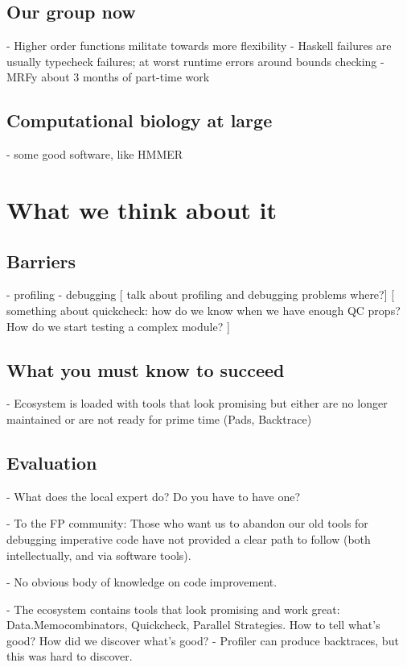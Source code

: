 \documentclass[preprint]{sigplanconf}
\begin{document}
\subsection{Our group now}
 - Higher order functions militate towards more flexibility
 - Haskell failures are usually typecheck failures; at worst runtime errors around bounds checking
 - MRFy about 3 months of part-time work

\subsection{Computational biology at large}
 - some good software, like HMMER

\section{What we think about it}

\subsection{Barriers}

- profiling
- debugging
 [ talk about profiling and debugging problems where?]
[ something about quickcheck: how do we know when we have enough QC props? How do we start testing a complex module? ]

\subsection{What you must know to succeed}
- Ecosystem is loaded with tools that look promising but either are no longer maintained or are not ready for prime time (Pads, Backtrace)

\subsection{Evaluation}
- What does the local expert do? Do you have to have one?

- To the FP community: Those who want us to abandon our old tools for debugging imperative code have not provided a clear path to follow (both intellectually, and via software tools).

- No obvious body of knowledge on code improvement.

- The ecosystem contains tools that look promising and work great: Data.Memocombinators, Quickcheck, Parallel Strategies. How to tell what's good? How did we discover what's good?
- Profiler can produce backtraces, but this was hard to discover.
\end{document}
